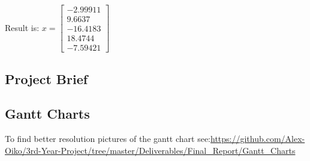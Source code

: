 \documentclass[12pt,a4paper]{article}
\begin{document}
Result is:
$x=\begin{bmatrix}
-2.99911\\
9.6637\\
-16.4183\\
18.4744\\
-7.59421
\end{bmatrix}$

\subsection{Project Brief}
\newpage
\subsection{Gantt Charts}
To find better resolution pictures of the gantt chart see:\url{https://github.com/Alex-Oiko/3rd-Year-Project/tree/master/Deliverables/Final_Report/Gantt_Charts} \cite{git_repo}
\topmargin=0pt
\voffset=0pt
\end{document}
